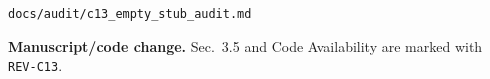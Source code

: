 \documentclass[11pt,a4paper]{article}
\begin{document}
\begin{center}
\texttt{docs/audit/c13\_empty\_stub\_audit.md}
\end{center}

\noindent\textbf{Manuscript/code change.}
Sec.~3.5 and Code Availability are marked with \texttt{REV-C13}.



\end{document}
